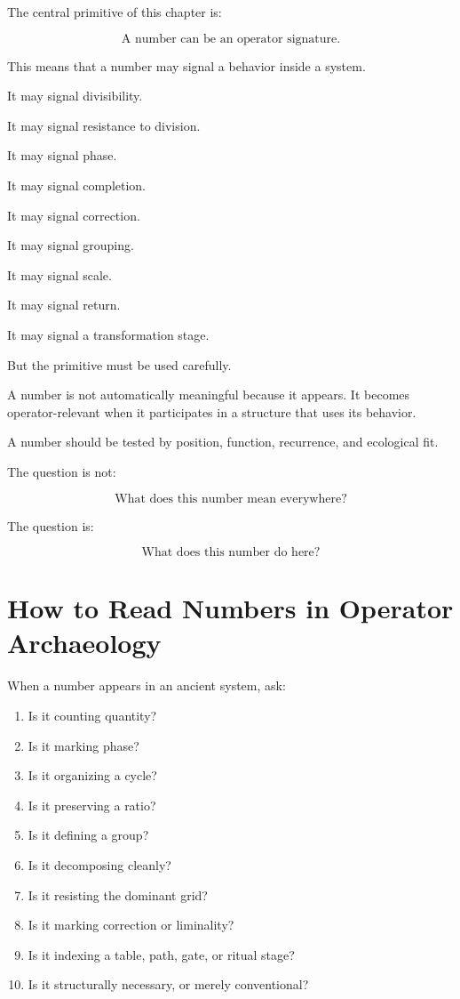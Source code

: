 \documentclass[11pt]{book}
\begin{document}
The central primitive of this chapter is:

\[
\text{A number can be an operator signature.}
\]

This means that a number may signal a behavior inside a system.

It may signal divisibility.

It may signal resistance to division.

It may signal phase.

It may signal completion.

It may signal correction.

It may signal grouping.

It may signal scale.

It may signal return.

It may signal a transformation stage.

But the primitive must be used carefully.

A number is not automatically meaningful because it appears. It becomes operator-relevant when it participates in a structure that uses its behavior.

A number should be tested by position, function, recurrence, and ecological fit.

The question is not:

\[
\text{What does this number mean everywhere?}
\]

The question is:

\[
\text{What does this number do here?}
\]

\section{How to Read Numbers in Operator Archaeology}

When a number appears in an ancient system, ask:

\begin{enumerate}[label=\arabic*.]
    \item Is it counting quantity?
    \item Is it marking phase?
    \item Is it organizing a cycle?
    \item Is it preserving a ratio?
    \item Is it defining a group?
    \item Is it decomposing cleanly?
    \item Is it resisting the dominant grid?
    \item Is it marking correction or liminality?
    \item Is it indexing a table, path, gate, or ritual stage?
    \item Is it structurally necessary, or merely conventional?
\end{enumerate}
\end{document}
